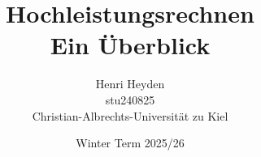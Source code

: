 


\title{Hochleistungsrechnen \\ \small Ein Überblick}
\date{Winter Term 2025/26}
\author{Henri Heyden \\%
    \small stu240825 \\%
    \small Christian-Albrechts-Universität zu Kiel%
}


\maketitle
\restoregeometry %

\tableofcontents




